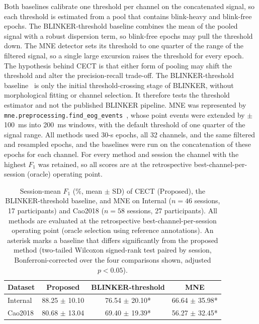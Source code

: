\documentclass[journal,twoside,web]{ieeecolor}
\begin{document}
Both baselines calibrate one threshold per channel on the concatenated signal, so each threshold is estimated from a pool that contains blink-heavy and blink-free epochs. The BLINKER-threshold baseline combines the mean of the pooled signal with a robust dispersion term, so blink-free epochs may pull the threshold down. The MNE detector sets its threshold to one quarter of the range of the filtered signal, so a single large excursion raises the threshold for every epoch. The hypothesis behind CECT is that either form of pooling may shift the threshold and alter the precision-recall trade-off. The BLINKER-threshold baseline~\citep{kleifges2017blinker} is only the initial threshold-crossing stage of BLINKER, without morphological fitting or channel selection. It therefore tests the threshold estimator and not the published BLINKER pipeline. MNE was represented by \texttt{mne.preprocessing.find\_eog\_events}~\citep{GramfortEtAl2013a}, whose point events were extended by $\pm$100~ms into 200~ms windows, with the default threshold of one quarter of the signal range. All methods used 30-s epochs, all 32 channels, and the same filtered and resampled epochs, and the baselines were run on the concatenation of these epochs for each channel. For every method and session the channel with the highest $F_1$ was retained, so all scores are at the retrospective best-channel-per-session (oracle) operating point.

\begin{table}[t]
  \centering
  \caption{Session-mean $F_1$ (\%, mean $\pm$ SD) of CECT (Proposed), the BLINKER-threshold baseline, and MNE on Internal ($n=46$ sessions, 17 participants) and Cao2018 ($n=58$ sessions, 27 participants). All methods are evaluated at the retrospective best-channel-per-session operating point (oracle selection using reference annotations). An asterisk marks a baseline that differs significantly from the proposed method (two-tailed Wilcoxon signed-rank test paired by session, Bonferroni-corrected over the four comparisons shown, adjusted $p < 0.05$).}
  \label{tab:f1_significance}
  \footnotesize
  \setlength{\tabcolsep}{3pt}
  \begin{tabular}{lccc}
    \toprule
    Dataset & Proposed & BLINKER-threshold & MNE \\
    \midrule
    Internal & 88.25 $\pm$ 10.10 & 76.54 $\pm$ 20.10* & 66.64 $\pm$ 35.98* \\
    Cao2018 & 80.68 $\pm$ 13.04 & 69.40 $\pm$ 19.39* & 56.27 $\pm$ 32.45* \\
    \bottomrule
  \end{tabular}
\end{table}
\end{document}
